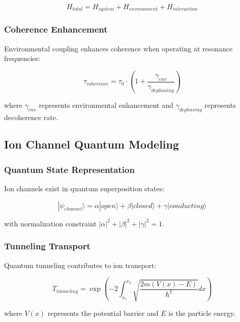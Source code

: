 \documentclass[12pt,a4paper]{article}
\begin{document}
\begin{equation}
H_{total} = H_{system} + H_{environment} + H_{interaction}
\end{equation}

\subsubsection{Coherence Enhancement}

Environmental coupling enhances coherence when operating at resonance frequencies:

\begin{equation}
\tau_{coherence} = \tau_0 \cdot \left(1 + \frac{\gamma_{env}}{\gamma_{dephasing}}\right)
\end{equation}

where $\gamma_{env}$ represents environmental enhancement and $\gamma_{dephasing}$ represents decoherence rate.

\subsection{Ion Channel Quantum Modeling}

\subsubsection{Quantum State Representation}

Ion channels exist in quantum superposition states:

\begin{equation}
|\psi_{channel}\rangle = \alpha|open\rangle + \beta|closed\rangle + \gamma|conducting\rangle
\end{equation}

with normalization constraint $|\alpha|^2 + |\beta|^2 + |\gamma|^2 = 1$.

\subsubsection{Tunneling Transport}

Quantum tunneling contributes to ion transport:

\begin{equation}
T_{tunneling} = \exp\left(-2\int_{x_1}^{x_2} \sqrt{\frac{2m(V(x) - E)}{\hbar^2}} dx\right)
\end{equation}

where $V(x)$ represents the potential barrier and $E$ is the particle energy.
\end{document}
